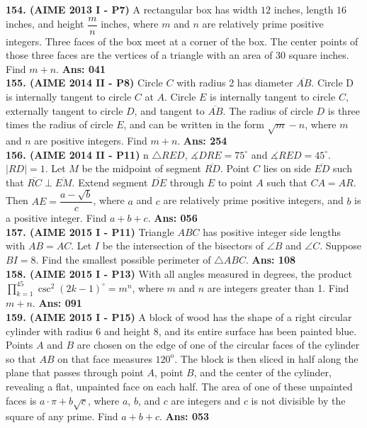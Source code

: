 \documentclass[letterpaper,10pt,addpoints]{exam}
\begin{document}
\textbf{154. (AIME 2013 I - P7) }   A rectangular box has width $12$ inches, length $16$ inches, and height $\dfrac{m}{n}$ inches, where $m$ and $n$ are relatively prime positive integers. Three faces of the box meet at a corner of the box. The center points of those three faces are the vertices of a triangle with an area of $30$ square inches. Find $m+n$.  \quad\textbf{Ans: 041}\\

\textbf{155. (AIME 2014 II - P8) }   Circle $C$ with radius 2 has diameter $\overline{AB}$. Circle D is internally tangent to circle $C$ at $A$. Circle $E$ is internally tangent to circle $C$, externally tangent to circle $D$, and tangent to $\overline{AB}$. The radius of circle $D$ is three times the radius of circle $E$, and can be written in the form $\sqrt{m}-n$, where $m$ and $n$ are positive integers. Find $m+n$.  \quad\textbf{Ans: 254}\\

\textbf{156. (AIME 2014 II - P11) }   n $\triangle RED$, $\measuredangle DRE=75^{\circ}$ and $\measuredangle RED=45^{\circ}$. $|RD|=1$. Let $M$ be the midpoint of segment $\overline{RD}$. Point $C$ lies on side $\overline{ED}$ such that $\overline{RC}\perp\overline{EM}$. Extend segment $\overline{DE}$ through $E$ to point $A$ such that $CA=AR$. Then $AE=\dfrac{a-\sqrt{b}}{c}$, where $a$ and $c$ are relatively prime positive integers, and $b$ is a positive integer. Find $a+b+c$.  \quad\textbf{Ans: 056}\\

\textbf{157. (AIME 2015 I - P11) }   Triangle $ABC$ has positive integer side lengths with $AB=AC$. Let $I$ be the intersection of the bisectors of $\angle B$ and $\angle C$. Suppose $BI=8$. Find the smallest possible perimeter of $\triangle ABC$.  \quad\textbf{Ans: 108}\\

\textbf{158. (AIME 2015 I - P13) }   With all angles measured in degrees, the product $\prod_{k=1}^{45} \csc^2(2k-1)^\circ=m^n$, where $m$ and $n$ are integers greater than 1. Find $m+n$.  \quad\textbf{Ans: 091}\\

\textbf{159. (AIME 2015 I - P15) }   A block of wood has the shape of a right circular cylinder with radius $6$ and height $8$, and its entire surface has been painted blue. Points $A$ and $B$ are chosen on the edge of one of the circular faces of the cylinder so that $AB$ on that face measures $120^\text{o}$. The block is then sliced in half along the plane that passes through point $A$, point $B$, and the center of the cylinder, revealing a flat, unpainted face on each half. The area of one of these unpainted faces is $a\cdot\pi + b\sqrt{c}$, where $a$, $b$, and $c$ are integers and $c$ is not divisible by the square of any prime. Find $a+b+c$. \quad\textbf{Ans: 053}
\end{document}
